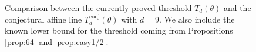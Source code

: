 \documentclass[11pt]{amsart}
\numberwithin{equation}{section}
\theoremstyle{plain}
\theoremstyle{remark}
\begin{document}
\begin{figure}[ht]

\caption{Comparison between the currently proved threshold $T_d(\theta)$ and the conjectural affine line $T_d^{\mathrm{conj}}(\theta)$ with $d=9$. We also include the known lower bound for the threshold coming from Propositions \ref{prop:64} and \ref{prop:easy1/2}.}
\label{fig:threshold-curve-conjecture}
\end{figure}
\end{document}

